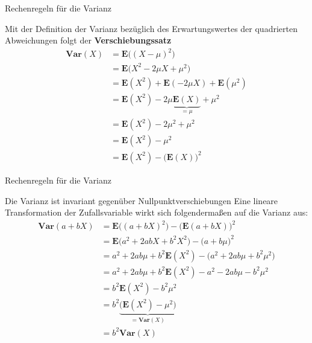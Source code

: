 \documentclass[mathserif]{beamer}
\begin{document}
\begin{frame}{Rechenregeln für die Varianz}
    \begin{outline}
        \1 Mit der Definition der Varianz bezüglich des Erwartungswertes der quadrierten Abweichungen folgt der \textbf{Verschiebungssatz}\begin{align*}
            \mathbf{Var}(X)&=\mathbf{E}\Big((X-\mu)^2\Big)\\
            &=\mathbf{E}\Big(X^2-2\mu X+\mu^2\Big)\\
            &=\mathbf{E}(X^2)+\mathbf{E}(-2\mu X)+\mathbf{E}(\mu^2)\\
            &=\mathbf{E}(X^2)-2\mu\underbrace{\mathbf{E}(X)}_{=\mu}+\mu^2\\
            &=\mathbf{E}(X^2)-2\mu^2+\mu^2\\
            &=\mathbf{E}(X^2)-\mu^2\\
            &=\mathbf{E}(X^2)-\Big(\mathbf{E}(X)\Big)^2
        \end{align*}
    \end{outline}
\end{frame}
\begin{frame}{Rechenregeln für die Varianz}
    \begin{outline}
        \1 Die Varianz ist invariant gegenüber Nullpunktverschiebungen
        \1 Eine lineare Transformation der Zufallsvariable wirkt sich folgendermaßen auf die Varianz aus:\begin{align*}
            \mathbf{Var}(a+bX)&=\mathbf{E}\Big((a+bX)^2\Big)-\Big(\mathbf{E}(a+bX)\Big)^2\\
            &=\mathbf{E}\Big(a^2+2abX+b^2X^2\Big)-\Big(a+b\mu\Big)^2\\
            &=a^2+2ab\mu+b^2\mathbf{E}(X^2)-\Big(a^2+2ab\mu+b^2\mu^2\Big)\\
            &=a^2+2ab\mu+b^2\mathbf{E}(X^2)-a^2-2ab\mu-b^2\mu^2\\
            &=b^2\mathbf{E}(X^2)-b^2\mu^2\\
            &=b^2\underbrace{\Big(\mathbf{E}(X^2)-\mu^2\Big)}_{=\mathbf{Var}(X)}\\
            &=b^2\mathbf{Var}(X)
        \end{align*}
    \end{outline}
\end{frame}
\end{document}
